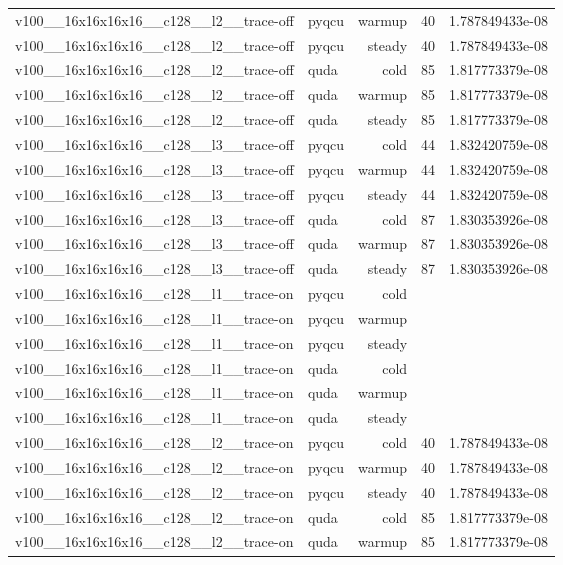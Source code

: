 \begin{table}[htbp]
\begin{tabular}{@{}llrrr@{}}
v100\_\_16x16x16x16\_\_c128\_\_l2\_\_trace-off & pyqcu & warmup & 40 & 1.787849433e-08 \\
v100\_\_16x16x16x16\_\_c128\_\_l2\_\_trace-off & pyqcu & steady & 40 & 1.787849433e-08 \\
v100\_\_16x16x16x16\_\_c128\_\_l2\_\_trace-off & quda & cold & 85 & 1.817773379e-08 \\
v100\_\_16x16x16x16\_\_c128\_\_l2\_\_trace-off & quda & warmup & 85 & 1.817773379e-08 \\
v100\_\_16x16x16x16\_\_c128\_\_l2\_\_trace-off & quda & steady & 85 & 1.817773379e-08 \\
v100\_\_16x16x16x16\_\_c128\_\_l3\_\_trace-off & pyqcu & cold & 44 & 1.832420759e-08 \\
v100\_\_16x16x16x16\_\_c128\_\_l3\_\_trace-off & pyqcu & warmup & 44 & 1.832420759e-08 \\
v100\_\_16x16x16x16\_\_c128\_\_l3\_\_trace-off & pyqcu & steady & 44 & 1.832420759e-08 \\
v100\_\_16x16x16x16\_\_c128\_\_l3\_\_trace-off & quda & cold & 87 & 1.830353926e-08 \\
v100\_\_16x16x16x16\_\_c128\_\_l3\_\_trace-off & quda & warmup & 87 & 1.830353926e-08 \\
v100\_\_16x16x16x16\_\_c128\_\_l3\_\_trace-off & quda & steady & 87 & 1.830353926e-08 \\
v100\_\_16x16x16x16\_\_c128\_\_l1\_\_trace-on & pyqcu & cold &  &  \\
v100\_\_16x16x16x16\_\_c128\_\_l1\_\_trace-on & pyqcu & warmup &  &  \\
v100\_\_16x16x16x16\_\_c128\_\_l1\_\_trace-on & pyqcu & steady &  &  \\
v100\_\_16x16x16x16\_\_c128\_\_l1\_\_trace-on & quda & cold &  &  \\
v100\_\_16x16x16x16\_\_c128\_\_l1\_\_trace-on & quda & warmup &  &  \\
v100\_\_16x16x16x16\_\_c128\_\_l1\_\_trace-on & quda & steady &  &  \\
v100\_\_16x16x16x16\_\_c128\_\_l2\_\_trace-on & pyqcu & cold & 40 & 1.787849433e-08 \\
v100\_\_16x16x16x16\_\_c128\_\_l2\_\_trace-on & pyqcu & warmup & 40 & 1.787849433e-08 \\
v100\_\_16x16x16x16\_\_c128\_\_l2\_\_trace-on & pyqcu & steady & 40 & 1.787849433e-08 \\
v100\_\_16x16x16x16\_\_c128\_\_l2\_\_trace-on & quda & cold & 85 & 1.817773379e-08 \\
v100\_\_16x16x16x16\_\_c128\_\_l2\_\_trace-on & quda & warmup & 85 & 1.817773379e-08 \\

\end{tabular}
\end{table}
